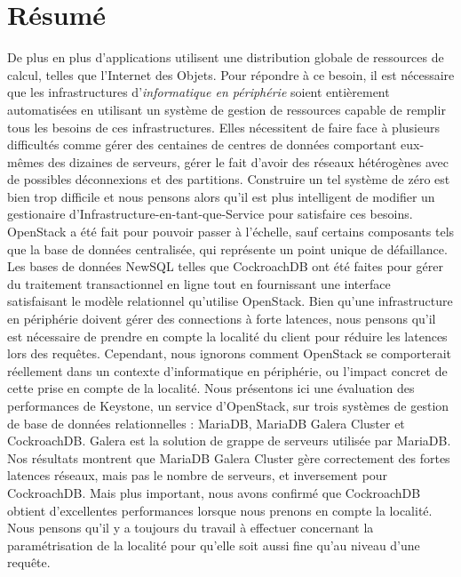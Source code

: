 \documentclass[a4paper, 10pt, titlepage]{report}
\begin{document}
\section*{Résumé}

De plus en plus d'applications utilisent une distribution globale de ressources de calcul, telles que l'Internet des Objets. Pour répondre à ce besoin, il est nécessaire que les infrastructures d'\emph{informatique en périphérie} soient entièrement automatisées en utilisant un système de gestion de ressources capable de remplir tous les besoins de ces infrastructures. Elles nécessitent de faire face à plusieurs difficultés comme gérer des centaines de centres de données comportant eux-mêmes des dizaines de serveurs, gérer le fait d'avoir des réseaux hétérogènes avec de possibles déconnexions et des partitions. Construire un tel système de zéro est bien trop difficile et nous pensons alors qu'il est plus intelligent de modifier un gestionaire d'Infrastructure-en-tant-que-Service pour satisfaire ces besoins.
OpenStack a été fait pour pouvoir passer à l'échelle, sauf certains composants tels que la base de données centralisée, qui représente un point unique de défaillance. Les bases de données NewSQL telles que CockroachDB ont été faites pour gérer du traitement transactionnel en ligne tout en fournissant une interface satisfaisant le modèle relationnel qu'utilise OpenStack. Bien qu'une infrastructure en périphérie doivent gérer des connections à forte latences, nous pensons qu'il est nécessaire de prendre en compte la localité du client pour réduire les latences lors des requêtes.
Cependant, nous ignorons comment OpenStack se comporterait réellement dans un contexte d'informatique en périphérie, ou l'impact concret de cette prise en compte de la localité.
Nous présentons ici une évaluation des performances de Keystone, un service d'OpenStack, sur trois systèmes de gestion de base de données relationnelles : MariaDB, MariaDB Galera Cluster et CockroachDB. Galera est la solution de grappe de serveurs utilisée par MariaDB.
Nos résultats montrent que MariaDB Galera Cluster gère correctement des fortes latences réseaux, mais pas le nombre de serveurs, et inversement pour CockroachDB. Mais plus important, nous avons confirmé que CockroachDB obtient d'excellentes performances lorsque nous prenons en compte la localité.
Nous pensons qu'il y a toujours du travail à effectuer concernant la paramétrisation de la localité pour qu'elle soit aussi fine qu'au niveau d'une requête.


\end{document}
